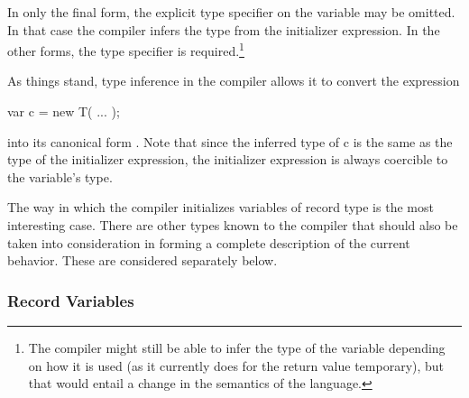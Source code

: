 In only the final form, the explicit type specifier on the variable may be omitted.  In that
case the compiler infers the type from the initializer expression.  In the other forms,
the type specifier is required.\footnote{The compiler might still be able to infer the type of the
variable depending on how it is used (as it currently does for the return value
temporary), but that would entail a change in the semantics of the language.}

As things stand, type inference in the compiler allows it to convert the
expression
\begin{chapel}
   var c = new T( ... );
\end{chapel}
\noindent
into its canonical form .  Note that since the inferred type
of c is the same as the type of the initializer expression, the initializer expression is
always coercible to the variable's type.

The way in which the compiler initializes variables of record type is the most interesting
case.  There are other types known to the compiler that should also be taken into
consideration in forming a complete description of the current behavior.  These are
considered separately below.


\subsubsection{Record Variables}

